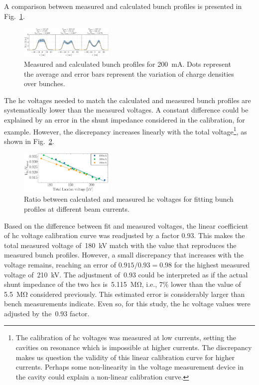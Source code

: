\documentclass[a4paper,
               ]{jacow}
\begin{document}
A comparison between measured and calculated bunch profiles is presented in Fig.~\ref{fig:comparison_fit}.
\begin{figure}
    \centering
    \includegraphics[width=0.4\textwidth]{WEPR42_f2.pdf}
    \caption{Measured and calculated bunch profiles for \SI{200}{\milli\ampere}. Dots represent the average and error bars represent the variation of charge densities over bunches.}
    \label{fig:comparison_fit}
\end{figure} The \gls{hc} voltages needed to match the calculated and measured bunch profiles are systematically lower than the measured voltages. A constant difference could be explained by an error in the shunt impedance considered in the calibration, for example. However, the discrepancy increases linearly with the total voltage\footnote{The calibration of \gls{hc} voltages was measured at low currents, setting the cavities on resonance which is impossible at higher currents. The discrepancy makes us question the validity of this linear calibration curve for higher currents. Perhaps some non-linearity in the voltage measurement device in the cavity could explain a non-linear calibration curve.}, as shown in Fig.~\ref{fig:vfit_vmeas}.\begin{figure}
    \centering
    \includegraphics[width=0.4\textwidth]{WEPR42_f3.pdf}
    \caption{Ratio between calculated and measured \gls{hc} voltages for fitting bunch profiles at different beam currents.}
    \label{fig:vfit_vmeas}
\end{figure}

Based on the difference between fit and measured voltages, the linear coefficient of \gls{hc} voltage calibration curve was readjusted by a factor $0.93$. This makes the total measured voltage of~\SI{180}{\kilo\volt} match with the value that reproduces the measured bunch profiles. However, a small discrepancy that increases with the voltage remains, reaching an error of $0.915/0.93 = 0.98$ for the highest measured voltage of~\SI{210}{\kilo\volt}. The adjustment of~$0.93$ could be interpreted as if the actual shunt impedance of the two \glspl{hc} is~\SI{5.115}{\mega\ohm}, i.e., 7\% lower than the value of \SI{5.5}{\mega\ohm} considered previously. This estimated error is considerably larger than bench measurements indicate. Even so, for this study, the \gls{hc} voltage values were adjusted by the~$0.93$ factor.
\end{document}
